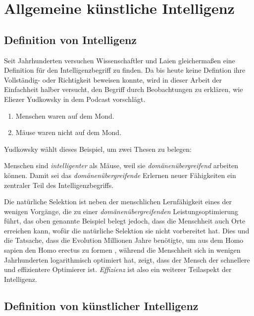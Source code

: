 \chapter{Allgemeine künstliche Intelligenz}
\section{Definition von Intelligenz}
Seit Jahrhunderten versuchen Wissenschaftler und Laien gleichermaßen eine Definition für den Intelligenzbegriff zu finden. Da bis heute keine Defintion ihre Vollständig- oder Richtigkeit beweisen konnte, wird in dieser Arbeit der Einfachheit halber versucht, den Begriff durch Beobachtungen zu erklären, wie Eliezer Yudkowsky in dem Podcast  vorschlägt.
\begin{enumerate}
\item Menschen waren auf dem Mond.
\item Mäuse waren nicht auf dem Mond.
\end{enumerate}
Yudkowsky wählt dieses Beispiel, um zwei Thesen zu belegen:

Menschen sind \emph{intelligenter} als Mäuse, weil sie \emph{domänenübergreifend} arbeiten können. Damit sei das \emph{domänenübergreifende} Erlernen neuer Fähigkeiten ein zentraler Teil des Intelligenzbegriffs.


Die natürliche Selektion ist neben der menschlichen Lernfähigkeit eines der wenigen Vorgänge, die zu einer \emph{domänenübergreifenden} Leistungsoptimierung führt, das oben genannte Beispiel belegt jedoch, dass die Menschheit auch Orte erreichen kann, wofür die natürliche Selektion sie nicht vorbereitet hat. Dies und die Tatsache, dass die Evolution Millionen Jahre benötigte, um aus dem Homo sapien den Homo erectus zu formen , während die Menschheit sich in wenigen Jahrhunderten logarithmisch optimiert hat, zeigt, dass der Mensch der schnellere und effizientere Optimierer ist. \emph{Effizienz} ist also ein weiterer Teilaspekt der Intelligenz.

\section{Definition von künstlicher Intelligenz}

